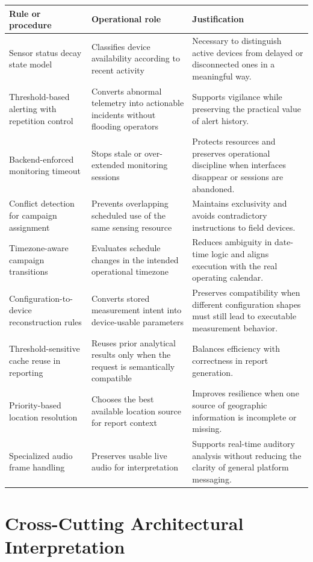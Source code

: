 \documentclass[11pt,a4paper]{article}
\begin{document}
\begin{longtable}{@{}p{}p{}p{}@{}}
\toprule
\textbf{Rule or procedure} & \textbf{Operational role} & \textbf{Justification} \\
\midrule
\endhead
Sensor status decay state model & Classifies device availability according to recent activity & Necessary to distinguish active devices from delayed or disconnected ones in a meaningful way. \\
Threshold-based alerting with repetition control & Converts abnormal telemetry into actionable incidents without flooding operators & Supports vigilance while preserving the practical value of alert history. \\
Backend-enforced monitoring timeout & Stops stale or over-extended monitoring sessions & Protects resources and preserves operational discipline when interfaces disappear or sessions are abandoned. \\
Conflict detection for campaign assignment & Prevents overlapping scheduled use of the same sensing resource & Maintains exclusivity and avoids contradictory instructions to field devices. \\
Timezone-aware campaign transitions & Evaluates schedule changes in the intended operational timezone & Reduces ambiguity in date-time logic and aligns execution with the real operating calendar. \\
Configuration-to-device reconstruction rules & Converts stored measurement intent into device-usable parameters & Preserves compatibility when different configuration shapes must still lead to executable measurement behavior. \\
Threshold-sensitive cache reuse in reporting & Reuses prior analytical results only when the request is semantically compatible & Balances efficiency with correctness in report generation. \\
Priority-based location resolution & Chooses the best available location source for report context & Improves resilience when one source of geographic information is incomplete or missing. \\
Specialized audio frame handling & Preserves usable live audio for interpretation & Supports real-time auditory analysis without reducing the clarity of general platform messaging. \\
\bottomrule
\end{longtable}

\section{Cross-Cutting Architectural Interpretation}
\end{document}

